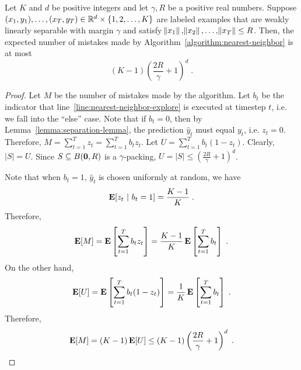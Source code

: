 \begin{theorem}
\label{theorem:mistake-bound-for-nearest-neighbor-algorithm}
Let $K$ and $d$ be positive integers and let $\gamma,R$ be a positive real
numbers. Suppose $(x_1,y_1), \ldots, (x_T, y_T) \in
\mathbb{R}^d \times \{1,2,\dots,K\}$ are labeled examples that are weakly linearly
separable with margin $\gamma$ and satisfy $\norm{x_1}, \norm{x_2}, \dots,
\norm{x_T} \le R$. Then, the expected number of mistakes made by
Algorithm~\ref{algorithm:nearest-neighbor} is at most
$$
(K-1) \left( \frac{2R}{\gamma} + 1\right)^d \; .
$$
\end{theorem}

\begin{proof}
Let $M$ be the number of mistakes made by the algorithm. Let $b_t$ be the
indicator that line~\ref{line:nearest-neighbor-explore} is executed at timestep
$t$, i.e. we fall into the ``else'' case. Note that if $b_t = 0$, then by
Lemma~\ref{lemma:separation-lemma}, the prediction $\widehat{y}_t$ must equal
$y_t$, i.e. $z_t = 0$. Therefore, $M = \sum_{t=1}^T z_t = \sum_{t=1}^T b_t z_t$.
Let $U = \sum_{t=1}^T b_t (1-z_t)$. Clearly, $|S| = U$. Since $S \subseteq B(\mathbf{0}, R)$
is a $\gamma$-packing, $U = |S| \le (\frac{2R}{\gamma} + 1)^d$.

Note that when $b_t = 1$, $\widehat{y}_t$ is chosen uniformly at random, we have
$$
\operatorname*{\mathbf{E}}[ z_t ~|~ b_t = 1] = \frac{K-1}{K} \; .
$$
Therefore,
$$
\operatorname*{\mathbf{E}}[M] = \operatorname*{\mathbf{E}} \left[ \sum_{t=1}^T b_t z_t \right] = \frac{K-1}{K} \operatorname*{\mathbf{E}} \left[ \sum_{t=1}^T b_t \right] \; .
$$
On the other hand,
$$
\operatorname*{\mathbf{E}}[U] = \operatorname*{\mathbf{E}} \left[ \sum_{t=1}^T b_t (1-z_t) \right] = \frac 1 K \operatorname*{\mathbf{E}} \left[\sum_{t=1}^T b_t \right] \; .
$$
Therefore,
$$
\operatorname*{\mathbf{E}}[M] = (K-1) \operatorname*{\mathbf{E}}[U] \leq (K-1) \left(\frac{2R}{\gamma} + 1 \right)^d \; .
$$
\end{proof}
